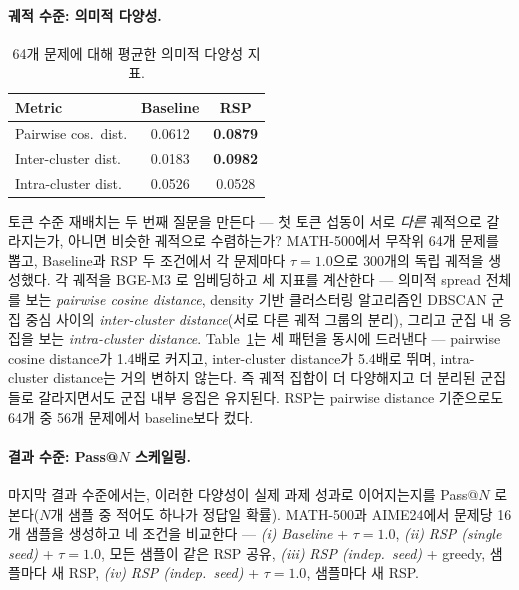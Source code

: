\paragraph{궤적 수준: 의미적 다양성.}
\begin{table}
  \vspace{-1.2em}
  \centering
  \caption{64개 문제에 대해 평균한 의미적 다양성 지표.}
  \label{tab:semantic_metrics}
  \footnotesize
  \setlength{\tabcolsep}{4pt}
  \renewcommand{\arraystretch}{0.9}
  \begin{tabular}{lcc}
    \toprule
    \textbf{Metric} & \textbf{Baseline} & \cellcolor{blue!10}\textbf{RSP} \\
    \midrule
    Pairwise cos.\ dist. & 0.0612 & \cellcolor{blue!10}\textbf{0.0879} \\
    Inter-cluster dist. & 0.0183 & \cellcolor{blue!10}\textbf{0.0982} \\
    Intra-cluster dist. & 0.0526 & \cellcolor{blue!10}0.0528 \\
    \bottomrule
  \end{tabular}
\end{table}
토큰 수준 재배치는 두 번째 질문을 만든다 --- 첫 토큰 섭동이 서로 \emph{다른} 궤적으로 갈라지는가, 아니면 비슷한 궤적으로 수렴하는가? MATH-500에서 무작위 64개 문제를 뽑고, Baseline과 RSP 두 조건에서 각 문제마다 $\tau{=}1.0$으로 300개의 독립 궤적을 생성했다. 각 궤적을 BGE-M3 \citep{chen2024bge}로 임베딩하고 세 지표를 계산한다 --- 의미적 spread 전체를 보는 \textit{pairwise cosine distance}, density 기반 클러스터링 알고리즘인 DBSCAN \citep{ester1996density} 군집 중심 사이의 \textit{inter-cluster distance}(서로 다른 궤적 그룹의 분리), 그리고 군집 내 응집을 보는 \textit{intra-cluster distance}. Table~\ref{tab:semantic_metrics}는 세 패턴을 동시에 드러낸다 --- pairwise cosine distance가 1.4배로 커지고, inter-cluster distance가 5.4배로 뛰며, intra-cluster distance는 거의 변하지 않는다. 즉 궤적 집합이 더 다양해지고 더 분리된 군집들로 갈라지면서도 군집 내부 응집은 유지된다. RSP는 pairwise distance 기준으로도 64개 중 56개 문제에서 baseline보다 컸다.

\paragraph{결과 수준: Pass@$N$ 스케일링.}
마지막 결과 수준에서는, 이러한 다양성이 실제 과제 성과로 이어지는지를 Pass@$N$ \citep{chen2021codex}로 본다($N$개 샘플 중 적어도 하나가 정답일 확률). MATH-500과 AIME24에서 문제당 16개 샘플을 생성하고 네 조건을 비교한다 --- \textit{(i)} \textit{Baseline} + $\tau{=}1.0$, \textit{(ii)} \textit{RSP (single seed)} + $\tau{=}1.0$, 모든 샘플이 같은 RSP 공유, \textit{(iii)} \textit{RSP (indep.\ seed)} + greedy, 샘플마다 새 RSP, \textit{(iv)} \textit{RSP (indep.\ seed)} + $\tau{=}1.0$, 샘플마다 새 RSP.

